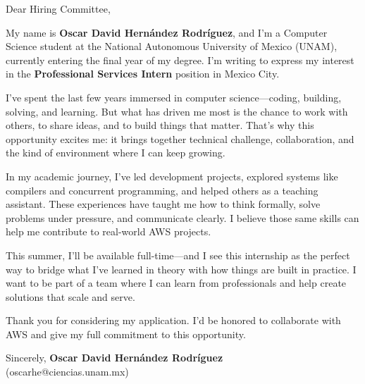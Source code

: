 \begin{cvparagraph}

    Dear Hiring Committee,


My name is \textbf{Oscar David Hernández Rodríguez}, and I’m a Computer Science student at the National Autonomous University of Mexico (UNAM), currently entering the final year of my degree. I’m writing to express my interest in the \textbf{Professional Services Intern} position in Mexico City.

I’ve spent the last few years immersed in computer science—coding, building, solving, and learning. But what has driven me most is the chance to work with others, to share ideas, and to build things that matter. That’s why this opportunity excites me: it brings together technical challenge, collaboration, and the kind of environment where I can keep growing.

In my academic journey, I’ve led development projects, explored systems like compilers and concurrent programming, and helped others as a teaching assistant. These experiences have taught me how to think formally, solve problems under pressure, and communicate clearly. I believe those same skills can help me contribute to real-world AWS projects.

This summer, I’ll be available full-time—and I see this internship as the perfect way to bridge what I’ve learned in theory with how things are built in practice. I want to be part of a team where I can learn from professionals and help create solutions that scale and serve.


Thank you for considering my application. I’d be honored to collaborate with AWS and give my full commitment to this opportunity.

Sincerely,  
\textbf{Oscar David Hernández Rodríguez}  \\
(oscarhe@ciencias.unam.mx)

\end{cvparagraph}
